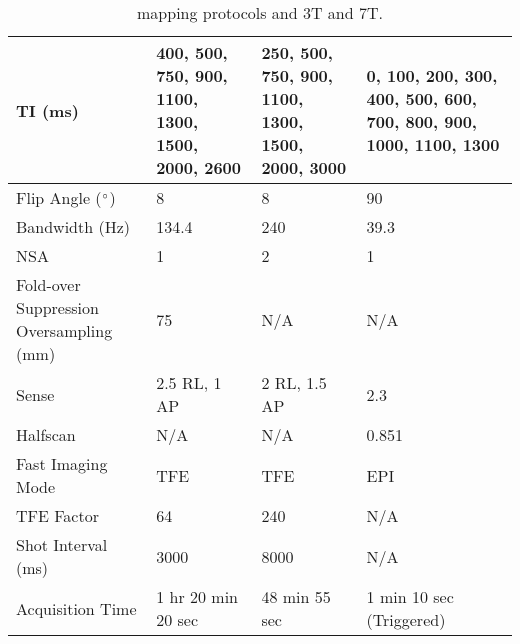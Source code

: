 \begin{table}[H]
\begin{tabularx}{1.0\textwidth}{X|X|X|X}
		TI (ms)                                   & 400, 500, 750, 900,   1100, 1300, 1500, 2000, 2600 & 250, 500, 750, 900,   1100, 1300, 1500, 2000, 3000 & 0, 100, 200, 300,   400, 500, 600, 700, 800, 900, 1000, 1100, 1300 \\ \hline
		Flip Angle ($\degree$)                    & 8                                                  & 8                                                  & 90                                                                 \\ \hline
		Bandwidth (Hz)                            & 134.4                                              & 240                                                & 39.3                                                               \\ \hline
		NSA                                       & 1                                                  & 2                                                  & 1                                                                  \\ \hline
		Fold-over Suppression   Oversampling (mm) & 75                                                 & N/A                                                & N/A                                                                \\ \hline
		Sense                                     & 2.5 RL, 1 AP                                       & 2 RL, 1.5 AP                                        & 2.3                                                                \\ \hline
		Halfscan                                  & N/A                                                & N/A                                                & 0.851                                                              \\ \hline
		Fast Imaging Mode                         & TFE                                                & TFE                                                & EPI                                                                \\ \hline
		TFE Factor                                & 64                                                 & 240                                                & N/A                                                                \\ \hline
		Shot Interval (ms)                        & 3000                                               & 8000                                               & N/A                                                                \\ \hline
		Acquisition Time                          & 1 hr 20 min 20 sec                                 & 48 min 55 sec                                      & 1 min 10 sec (Triggered) 
	\end{tabularx}
	\caption{\tone mapping protocols and 3T and 7T.}
	\label{tab:ex_t1_mapping}
\end{table}

